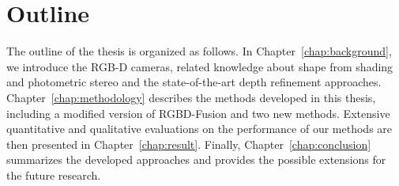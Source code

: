 \section{Outline}
The outline of the thesis is organized as follows.
In Chapter~\ref{chap:background}, we introduce the RGB-D cameras, related knowledge about shape from shading and photometric stereo and the state-of-the-art depth refinement approaches.
Chapter~\ref{chap:methodology} describes the methods developed in this thesis, including a modified version of RGBD-Fusion and two new methods. 
Extensive quantitative and qualitative evaluations on the performance of our methods are then presented in Chapter~\ref{chap:result}.
Finally, Chapter~\ref{chap:conclusion} summarizes the developed approaches and provides the possible extensions for the future research.


